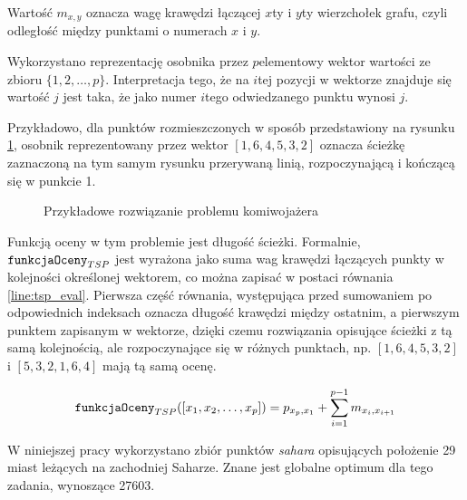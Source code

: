 \documentclass[./FM_mgr.tex]{subfiles}
\begin{document}
	Wartość $m_{x, y}$ oznacza wagę krawędzi łączącej $x$ty i $y$ty wierzchołek grafu, czyli odległość między punktami o numerach $x$ i $y$.
	
	Wykorzystano reprezentację osobnika przez $p$elementowy wektor wartości ze zbioru $\{ 1, 2, \ldots, p \}$.
	Interpretacja tego, że na $i$tej pozycji w wektorze znajduje się wartość $j$ jest taka, że jako numer $i$tego odwiedzanego punktu wynosi $j$.
	
	Przykładowo, dla punktów rozmieszczonych w sposób przedstawiony na rysunku \ref{figure:tsp_example}, osobnik reprezentowany przez wektor $[1, 6, 4, 5, 3, 2]$ oznacza ścieżkę zaznaczoną na tym samym rysunku przerywaną linią, rozpoczynającą i kończącą się w punkcie 1.
	
	\begin{figure} [H]
		\caption{Przykładowe rozwiązanie problemu komiwojażera \label{figure:tsp_example}}
		\centering
	\end{figure}
	
	Funkcją oceny w tym problemie jest długość ścieżki. 
	Formalnie, $\mathtt{funkcjaOceny}_{TSP}$ jest wyrażona jako suma wag krawędzi łączących punkty w kolejności określonej wektorem, co można zapisać w postaci równania \ref{line:tsp_eval}. 
	Pierwsza część równania, występująca przed sumowaniem po odpowiednich indeksach oznacza długość krawędzi między ostatnim, a pierwszym punktem zapisanym w wektorze, dzięki czemu rozwiązania opisujące ścieżki z tą samą kolejnością, ale rozpoczynające się w różnych punktach, np. $[1, 6, 4, 5, 3, 2]$ i $[5, 3, 2, 1, 6, 4]$ mają tą samą ocenę.
	
	\begin{align}
	\mathtt{funkcjaOceny}_{TSP}([x_1, x_2, \ldots, x_p]) = p_{x_p, x_1} + \sum_{i=1}^{p-1} m_{x_i, x_{i+1}} \label{line:tsp_eval}
	\end{align}
	
	W niniejszej pracy wykorzystano zbiór punktów \emph{sahara} \cite{sahara_points} opisujących położenie 29 miast leżących na zachodniej Saharze. 
	Znane jest globalne optimum dla tego zadania, wynoszące 27603.
	
\end{document}
